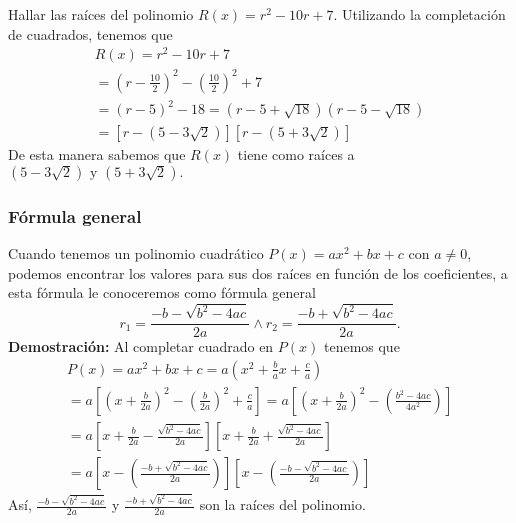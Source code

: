 {{        \begin{example}
            Hallar las raíces del polinomio $R(x) = r^2 - 10r + 7.$
            \exampleProof
            {
                Utilizando la completación de cuadrados, tenemos que
                \begin{gather*}
                    R(x) = r^2 - 10r + 7\\
                    = \left( r - \frac{10}{2} \right)^2 - \left( \frac{10}{2} \right)^2 + 7\\
                    = \left( r - 5 \right)^2 - 18
                    = \left( r - 5 + \sqrt {18} \right)\left( r - 5 - \sqrt {18} \right)\\
                    = \left[ r - \left( 5 - 3\sqrt {2} \right)\right]\left[ r - \left( 5 + 3\sqrt {2} \right)\right]
                \end{gather*}
                De esta manera sabemos que $R(x)$ tiene como raíces a $\left( 5 - 3\sqrt {2} \right) \mbox{ y } \left( 5 + 3\sqrt {2} \right).$
            }
        \end{example}
    }
    \subsubsection{Fórmula general}
    {
        Cuando tenemos un polinomio cuadrático $P(x) = ax^2 + bx + c$ con $a \neq 0$, podemos encontrar los valores para sus dos raíces en función de los coeficientes, a esta fórmula le conoceremos como fórmula general \[r_1 = \frac{-b - \sqrt {b^2 - 4ac}}{2a} \land r_2 = \frac{-b + \sqrt {b^2 - 4ac}}{2a}.\]
        \textbf{Demostración:} Al completar cuadrado en $P(x)$ tenemos que
        \begin{gather*}
            P(x) = ax^2 + bx + c = a \left( x^2 + \frac{b}{a}x + \frac{c}{a} \right) \\
            = a \left[ \left( x + \frac{b}{2a} \right)^2 - \left( \frac{b}{2a} \right)^2 + \frac{c}{a} \right]
            = a \left[ \left( x + \frac{b}{2a} \right)^2 - \left( \frac{b^2 - 4ac}{4a^2}\right) \right] \\
            = a \left[ x + \frac{b}{2a} - \frac{\sqrt {b^2 - 4ac}}{2a}\right]\left[ x + \frac{b}{2a} + \frac{\sqrt {b^2 - 4ac}}{2a}\right] \\
            = a \left[ x - \left( \frac{-b + \sqrt {b^2 - 4ac}}{2a} \right) \right]\left[ x - \left( \frac{-b - \sqrt {b^2 - 4ac}}{2a} \right) \right]
        \end{gather*}
        Así, $\frac{-b - \sqrt {b^2 - 4ac}}{2a}$ y $\frac{-b + \sqrt {b^2 - 4ac}}{2a}$ son la raíces del polinomio.
    }

}
